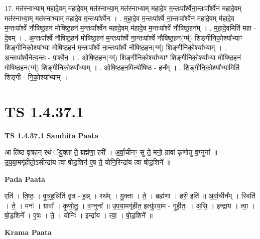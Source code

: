 \documentclass[17pt]{extarticle}
\begin{document}
17. मत॑स्नाभ्याम् महादे॒वम् म॑हादे॒वम् मत॑स्नाभ्या॒म् मत॑स्नाभ्याम् महादे॒व म॒न्तःपा᳚र्श्वेना॒न्तःपा᳚र्श्वेन महादे॒वम् मत॑स्नाभ्या॒म् मत॑स्नाभ्याम् महादे॒व म॒न्तःपा᳚र्श्वेन । . म॒हा॒दे॒व म॒न्तःपा᳚र्श्वे ना॒न्तःपा᳚र्श्वेन महादे॒वम् म॑हादे॒व म॒न्तःपा᳚र्श्वे नौषिष्ठ॒हन॑ मोषिष्ठ॒हन॑ म॒न्तःपा᳚र्श्वेन महादे॒वम् म॑हादे॒व म॒न्तःपा᳚र्श्वे नौषिष्ठ॒हन᳚म् । . म॒हा॒दे॒वमिति॑ महा - दे॒वम् । . अ॒न्तःपा᳚र्श्वे नौषिष्ठ॒हन॑ मोषिष्ठ॒हन॑ म॒न्तःपा᳚र्श्वे ना॒न्तःपा᳚र्श्वे नौषिष्ठ॒हन(ग्म्॑) शिङ्गीनिको॒श्या᳚भ्याꣳ शिङ्गीनिको॒श्या᳚भ्या मोषिष्ठ॒हन॑ म॒न्तःपा᳚र्श्वे ना॒न्तःपा᳚र्श्वे नौषिष्ठ॒हन(ग्म्॑) शिङ्गीनिको॒श्या᳚भ्याम् । . अ॒न्तःपा᳚र्श्वे॒नेत्य॒न्तः - पा॒र्श्वे॒न॒ । . ओ॒षि॒ष्ठ॒हन(ग्म्॑) शिङ्गीनिको॒श्या᳚भ्याꣳ शिङ्गीनिको॒श्या᳚भ्या मोषिष्ठ॒हन॑ मोषिष्ठ॒हन(ग्म्॑) शिङ्गीनिको॒श्या᳚भ्याम् । . ओ॒षि॒ष्ठ॒हन॒मित्यो॑षिष्ठ - हन᳚म् । . शि॒ङ्गी॒नि॒को॒श्या᳚भ्या॒मिति॑ शिङ्गी - नि॒को॒श्या᳚भ्याम् । \newline
\pagebreak
{}
\section*{ TS 1.4.37.1 }

\textbf{TS 1.4.37.1 } \newline
\textbf{Samhita Paata} \newline

आ ति॑ष्ठ वृत्रह॒न् रथं॑ ॅयु॒क्ता ते॒ ब्रह्म॑णा॒ हरी᳚ । अ॒र्वा॒चीनꣳ॒॒ सु ते॒ मनो॒ ग्रावा॑ कृणोतु व॒ग्नुना᳚ ॥उ॒प॒या॒मगृ॑हीतो॒ऽसीन्द्रा॑य त्वा षोड॒शिन॑ ए॒ष ते॒ योनि॒रिन्द्रा॑य त्वा षोड॒शिने᳚ ॥ \newline

\textbf{Pada Paata} \newline

एति॑ । ति॒ष्ठ॒ । वृ॒त्र॒ह॒न्निति॑ वृत्र - ह॒न्न् । रथ᳚म् । यु॒क्ता । ते॒ । ब्रह्म॑णा । हरी॒ इति॑ ॥ अ॒र्वा॒चीन᳚म् । स्विति॑ । ते॒ । मनः॑ । ग्रावा᳚ । कृ॒णो॒तु॒ । व॒ग्नुना᳚ ॥ उ॒प॒या॒मगृ॑हीत॒ इत्यु॑पया॒म - गृ॒ही॒तः॒ । अ॒सि॒ । इन्द्रा॑य । त्वा॒ । षो॒ड॒शिने᳚ । ए॒षः । ते॒ । योनिः॑ । इन्द्रा॑य । त्वा॒ । षो॒ड॒शिने᳚ ॥  \newline


\textbf{Krama Paata} \newline
\end{document}
